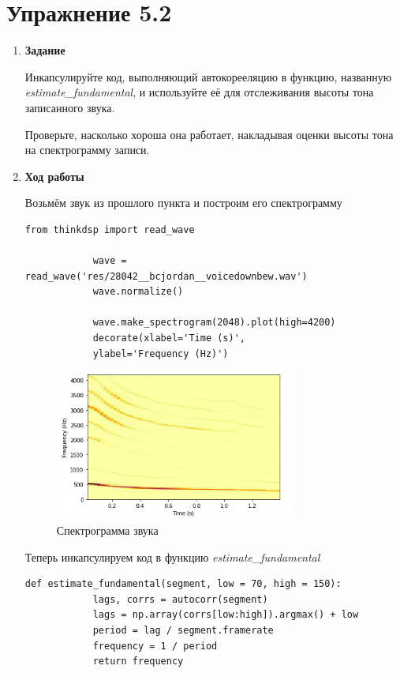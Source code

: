 \documentclass[a4paper,12pt]{article}
\begin{document}
	\section{Упражнение 5.2}
	
	\begin{enumerate}
		
		
		\item \textbf{Задание}
		
		Инкапсулируйте код, выполняющий автокорееляцию в функцию, названную \textit{estimate\_fundamental}, и используйте её для отслеживания высоты тона записанного звука.
		
		Проверьте, насколько хороша она работает, накладывая оценки высоты тона на спектрограмму записи.
		
		\item \textbf{Ход работы}
		
		Возьмём звук из прошлого пункта и построим его спектрограмму
		\begin{lstlisting}[caption=Спектрограмма звука]
			from thinkdsp import read_wave
			
			wave = read_wave('res/28042__bcjordan__voicedownbew.wav')
			wave.normalize()
			
			wave.make_spectrogram(2048).plot(high=4200)
			decorate(xlabel='Time (s)', 
			ylabel='Frequency (Hz)')
		\end{lstlisting}
		\begin{figure}[H]
			\centering
			\includegraphics[width=0.75\textwidth]{2_1.png}
			\caption{Спектрограмма звука}
			\label{fig:2.1}
		\end{figure}
	
	
		Теперь инкапсулируем код в функцию \textit{estimate\_fundamental}
		\begin{lstlisting}[caption=Метод \textit{estimate\_fundamental}]
			def estimate_fundamental(segment, low = 70, high = 150):
			lags, corrs = autocorr(segment)
			lags = np.array(corrs[low:high]).argmax() + low
			period = lag / segment.framerate
			frequency = 1 / period
			return frequency
		\end{lstlisting}
		

\end{enumerate}
\end{document}
